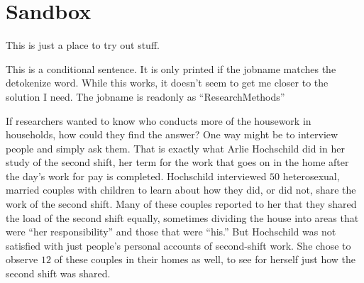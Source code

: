 \chapter{Sandbox}\label{ch99:Sandbox}

This is just a place to try out stuff.

This is a conditional sentence. It is only printed if the jobname matches the detokenize word. While this works, it doesn't seem to get me closer to the solution I need. The jobname is readonly as ``ResearchMethods''


If researchers wanted to know who conducts more of the housework in households, how could they find the answer? One way might be to interview people and simply ask them. That is exactly what Arlie Hochschild did in her study of the second shift, her term for the work that goes on in the home after the day's work for pay is completed. Hochschild interviewed $ 50 $ heterosexual, married couples with children to learn about how they did, or did not, share the work of the second shift. Many of these couples reported to her that they shared the load of the second shift equally, sometimes dividing the house into areas that were ``her responsibility'' and those that were ``his.'' But Hochschild was not satisfied with just people's personal accounts of second-shift work. She chose to observe $ 12 $ of these couples in their homes as well, to see for herself just how the second shift was shared.
